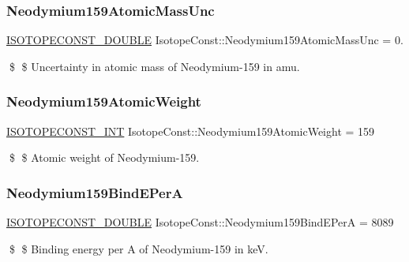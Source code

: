 \subsubsection{\texorpdfstring{Neodymium159\+Atomic\+Mass\+Unc}{Neodymium159AtomicMassUnc}}
{\footnotesize\ttfamily \mbox{\hyperlink{group___isotope_const-_macros_ga8f45a7272ce02c0b4c65c44636ed719a}{I\+S\+O\+T\+O\+P\+E\+C\+O\+N\+S\+T\+\_\+\+D\+O\+U\+B\+LE}} Isotope\+Const\+::\+Neodymium159\+Atomic\+Mass\+Unc = 0.}

\$ \$ Uncertainty in atomic mass of Neodymium-\/159 in amu. \mbox{\label{group___isotope_const-_neodymium-_nd159_ga4ad2bd810f600cbd48a4818de4ff55bf}} 
\subsubsection{\texorpdfstring{Neodymium159\+Atomic\+Weight}{Neodymium159AtomicWeight}}
{\footnotesize\ttfamily \mbox{\hyperlink{group___isotope_const-_macros_ga5f18360b3e99483a35c32d789e62621c}{I\+S\+O\+T\+O\+P\+E\+C\+O\+N\+S\+T\+\_\+\+I\+NT}} Isotope\+Const\+::\+Neodymium159\+Atomic\+Weight = 159}

\$ \$ Atomic weight of Neodymium-\/159. \mbox{\label{group___isotope_const-_neodymium-_nd159_gad73f159762456e0efda9e67be7026222}} 
\subsubsection{\texorpdfstring{Neodymium159\+Bind\+E\+PerA}{Neodymium159BindEPerA}}
{\footnotesize\ttfamily \mbox{\hyperlink{group___isotope_const-_macros_ga8f45a7272ce02c0b4c65c44636ed719a}{I\+S\+O\+T\+O\+P\+E\+C\+O\+N\+S\+T\+\_\+\+D\+O\+U\+B\+LE}} Isotope\+Const\+::\+Neodymium159\+Bind\+E\+PerA = 8089}

\$ \$ Binding energy per A of Neodymium-\/159 in keV. \mbox{\label{group___isotope_const-_neodymium-_nd159_ga2bc21a1ff89ef459eaade6c44ac2ba69}} 
